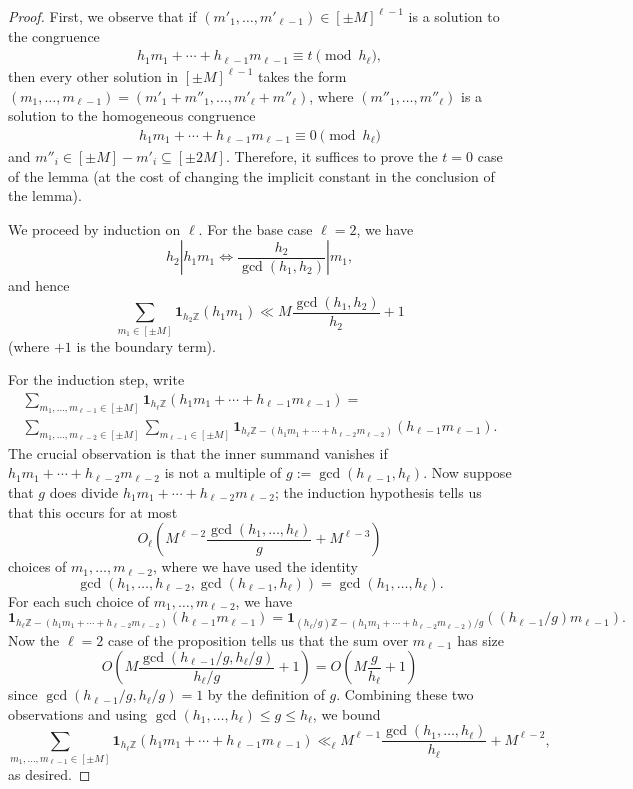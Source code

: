 \documentclass[11pt]{amsart}
\theoremstyle{definition}
\newcommand{\brac}[1]{\mathopen{}\left( #1 \mathclose{}\right)}
\begin{document}
\begin{proof}
First, we observe that if $(m'_1, \ldots, m'_{\ell-1}) \in [\pm M]^{\ell-1}$ is a solution to the congruence
\begin{align*}
    h_1 m_1 + \cdots + h_{\ell-1} m_{\ell-1} \equiv t \pmod {h_\ell},
\end{align*}
then every other solution in $[\pm M]^{\ell-1}$ takes the form $(m_1,\ldots, m_{\ell-1}) = (m'_1 + m''_1, \ldots, m'_\ell + m''_\ell)$, where $(m''_1, \ldots, m''_\ell)$ is a solution to the homogeneous congruence
\begin{align*}
    h_1 m_1 + \cdots + h_{\ell-1} m_{\ell-1} \equiv 0 \pmod {h_\ell}
\end{align*}
and $m''_i \in [\pm M]-m'_i\subseteq [\pm 2M]$.
Therefore, it suffices to prove the $t=0$ case of the lemma (at the cost of changing the implicit constant in the conclusion of the lemma).

We proceed by induction on $\ell$.  For the base case $\ell=2$, we have
$$h_2 | h_1 m_1 \iff \frac{h_2}{\gcd(h_1, h_2)}| m_1,$$
and hence
$$\sum_{m_1 \in [\pm M]} \mathbf{1}_{h_2\mathbb{Z}} (h_1m_1)\ll M \frac{\gcd(h_1, h_2)}{h_2} + 1$$
(where $+1$ is the boundary term).

For the induction step, write
\begin{multline*}
\sum_{m_1, \ldots, m_{\ell-1}\in[\pm M]}\mathbf{1}_{h_\ell\mathbb{Z} }(h_1 m_1 + \cdots + h_{\ell-1} m_{\ell-1})=\\
\sum_{m_1, \ldots, m_{\ell-2}\in[\pm M]} \sum_{m_{\ell-1} \in [\pm M]}\mathbf{1}_{h_\ell\mathbb{Z}-(h_1 m_1 + \cdots + h_{\ell-2} m_{\ell-2})}(h_{\ell-1} m_{\ell-1}).
\end{multline*}
The crucial observation is that the inner summand vanishes if $h_1m_1+\cdots+h_{\ell-2}m_{\ell-2}$ is not a multiple of $g:=\gcd(h_{\ell-1},h_\ell)$.  Now suppose that $g$ does divide $h_1m_1+\cdots+h_{\ell-2}m_{\ell-2}$; the induction hypothesis tells us that this occurs for at most $$O_\ell\brac{M^{\ell-2} \frac{\gcd(h_1, \ldots, h_\ell)}{g}+M^{\ell-3}}$$ choices of $m_1, \ldots, m_{\ell-2}$, where we have used the identity 
$$\gcd(h_1, \ldots, h_{\ell-2},\gcd(h_{\ell-1},h_\ell))=\gcd(h_{1},\ldots,h_\ell).$$  
For each such choice of $m_1, \ldots, m_{\ell-2}$, we have
$$\mathbf{1}_{h_\ell\mathbb{Z}-(h_1 m_1 + \cdots + h_{\ell-2} m_{\ell-2})}(h_{\ell-1} m_{\ell-1})=\mathbf{1}_{(h_\ell/g)\mathbb{Z}-(h_1 m_1 + \cdots + h_{\ell-2} m_{\ell-2})/g}((h_{\ell-1}/g)m_{\ell-1}).$$
Now the $\ell=2$ case of the proposition tells us that the sum over $m_{\ell-1}$ has size
$$O\brac{M\frac{\gcd(h_{\ell-1}/g,h_\ell/g)}{h_{\ell}/g}+1}=O\brac{M\frac{g}{h_{\ell}}+1}$$
since $\gcd(h_{\ell-1}/g,h_\ell/g)=1$ by the definition of $g$.  Combining these two observations and using $\gcd(h_1, \ldots, h_\ell) \leq g \leq h_\ell$, we bound
$$\sum_{m_1, \ldots, m_{\ell-1}\in[\pm M]}\mathbf{1}_{h_\ell\mathbb{Z} }(h_1 m_1 + \cdots + h_{\ell-1} m_{\ell-1})\ll_\ell M^{\ell-1}\frac{\gcd(h_1, \ldots, h_\ell)}{h_\ell}+M^{\ell-2},$$
as desired.
\end{proof}
\end{document}
